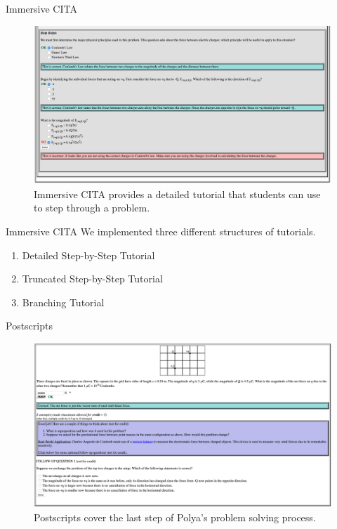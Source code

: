 \documentclass[xcolor=x11names,compress]{beamer}
\begin{document}
\begin{frame}{Immersive CITA}
	\begin{figure}
		\includegraphics[width=1.0\textwidth]{img/immersive_cita_example.png}
		\caption{Immersive CITA provides a detailed tutorial that students can use to step through a problem.}
		\label{fig:immersive_cita_example}
	\end{figure}
\end{frame}

\begin{frame}{Immersive CITA}
	We implemented three different structures of tutorials.
	\vspace{5mm}
	\begin{enumerate}
		\item Detailed Step-by-Step Tutorial
		\vspace{3mm}
		\item Truncated Step-by-Step Tutorial
		\vspace{3mm}	
		\item Branching Tutorial
	\end{enumerate}
\end{frame}

\begin{frame}{Postscripts}
	\begin{figure}
		\includegraphics[width=1.0\textwidth]{img/postscript_example.png}
		\caption{Postscripts cover the last step of Polya's problem solving process.}
		\label{fig:postscript_example}
	\end{figure}
\end{frame}
\end{document}
